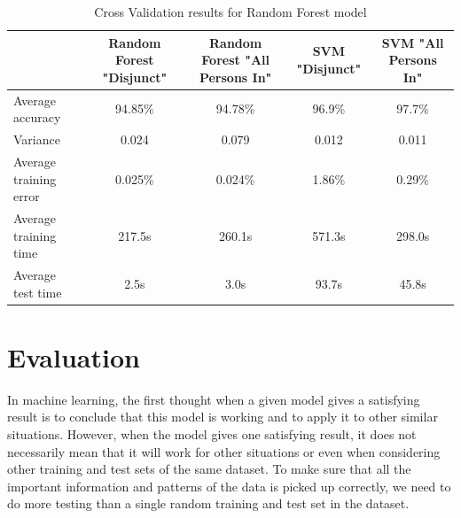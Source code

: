 \documentclass[conference]{IEEEtran}
\begin{document}



\begin{table}[t!]
    \color{baptiste}
    \caption{\color{baptiste}Cross Validation results for Random Forest model}
    \begin{center}
    \begin{tabular}{|l|c|c|c|c|}
        \hline
        \textbf{} & \textbf{Random Forest "Disjunct"} & \textbf{Random Forest "All Persons In"} & \textbf{SVM "Disjunct"} & \textbf{SVM "All Persons In"}\\
        \hline
        Average accuracy & 94.85\% & 94.78\% & 96.9\% & 97.7\% \\
        \hline
        Variance & 0.024 & 0.079 & 0.012 & 0.011 \\
        \hline
        Average training error & 0.025\% & 0.024\% & 1.86\% & 0.29\% \\
        \hline
        Average training time & 217.5s & 260.1s & 571.3s & 298.0s \\
        \hline
        Average test time & 2.5s & 3.0s & 93.7s & 45.8s \\
        \hline
    \end{tabular}
    \label{table:CV_results}
    \end{center}
\end{table}
\section{Evaluation}
\textcolor{baptiste}{In machine learning, the first thought when a given model gives a satisfying result is to conclude that this model is working and to apply it to other similar situations. However, when the model gives one satisfying result, it does not necessarily mean that it will work for other situations or even when considering other training and test sets of the same dataset. To make sure that all the important information and patterns of the data is picked up correctly, we need to do more testing than a single random training and test set in the dataset.}
\end{document}
